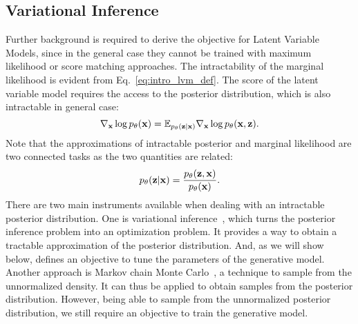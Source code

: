 \subsection{Variational Inference}\label{sec:intro_vi}
Further background is required to derive the objective for Latent Variable Models, since in the general case they cannot be trained with maximum likelihood or score matching approaches. The intractability of the marginal likelihood is evident from Eq.~\ref{eq:intro_lvm_def}. The score of the latent variable model requires the access to the posterior distribution, which is also intractable in general case:
\begin{equation}
\nabla_{{\mathbf{x}}}\log p_{\theta}({\mathbf{x}}) = \mathbb{E}_{p_{\theta}({\mathbf{z}}|{\mathbf{x}})} \nabla_{{\mathbf{x}}}\log p_{\theta}({\mathbf{x}}, {\mathbf{z}}).    
\end{equation}
Note that the approximations of intractable posterior and marginal likelihood are two connected tasks as the two quantities are related:
\begin{equation}
    p_{\theta}({\mathbf{z}}|{\mathbf{x}}) = \frac{p_{\theta}({\mathbf{z}}, {\mathbf{x}})}{p_{\theta}({\mathbf{x}})}.
\end{equation}
 \newline
There are two main instruments available when dealing with an intractable posterior distribution. One is variational inference~\citep{jordan1999introduction}, which turns the posterior inference problem into an optimization problem. It provides a way to obtain a tractable approximation of the posterior distribution. And, as we will show below, defines an objective to tune the parameters of the generative model.
Another approach is Markov chain Monte Carlo~\citep{neal1993probabilistic}, a technique to sample from the unnormalized density. 
It can thus be applied to obtain samples from the posterior distribution. 
However, being able to sample from the unnormalized posterior distribution, we still require an objective to train the generative model. 

